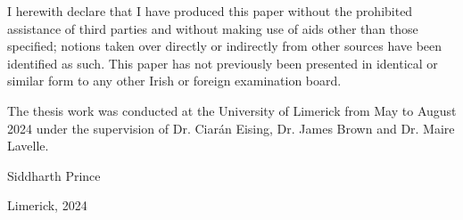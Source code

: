 


\begin{declaration}        %

I herewith declare that I have produced this paper without the prohibited assistance of third parties and without making use of aids other than those specified; notions taken over directly or indirectly from other sources have been identified as such. This paper has not previously been presented in identical or similar form to any other Irish or foreign examination board.

The thesis work was conducted at the University of Limerick from May to August 2024 under the supervision of Dr. Ciarán Eising, Dr. James Brown and Dr. Maire Lavelle. 

\vspace{10mm}

Siddharth Prince  

Limerick, 2024


\end{declaration}


